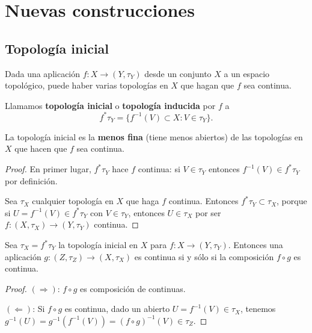 ﻿\section{Nuevas construcciones}


\subsection{Topología inicial}

Dada una aplicación $f: X \to (Y, \tau_Y)$ desde un conjunto $X$ a un espacio topológico, puede haber varias topologías en $X$ que hagan que $f$ sea continua.

\begin{definición}
    Llamamos \textbf{topología inicial} o \textbf{topología inducida} por $f$ a
    $$f^*\tau_Y = \{f^{-1}(V) \subset X : V \in \tau_Y\}.$$
\end{definición}


\begin{proposición}
    La topología inicial es la \textbf{menos fina} (tiene menos abiertos) de las topologías en $X$ que hacen que $f$ sea continua.
\end{proposición}
\begin{proof}
    En primer lugar, $f^*\tau_Y$ hace $f$ continua: si $V \in \tau_Y$ entonces $f^{-1}(V) \in f^*\tau_Y$ por definición.

    Sea $\tau_X$ cualquier topología en $X$ que haga $f$ continua. Entonces $f^*\tau_Y \subset \tau_X$, porque si $U = f^{-1}(V) \in f^*\tau_Y$ con $V \in \tau_Y$, entonces $U \in \tau_X$ por ser $f: (X, \tau_X) \to (Y, \tau_Y)$ continua.
\end{proof}

\begin{proposición}
    Sea $\tau_X = f^*\tau_Y$ la topología inicial en $X$ para $f: X \to (Y, \tau_Y)$. Entonces una aplicación $g: (Z, \tau_Z) \to (X, \tau_X)$ es continua si y sólo si la composición $f \circ g$ es continua.
\end{proposición}
\begin{proof}
    $(\Rightarrow)$: $f \circ g$ es composición de continuas.

    $(\Leftarrow)$: Si $f \circ g$ es continua, dado un abierto $U = f^{-1}(V) \in \tau_X$, tenemos $g^{-1}(U) = g^{-1}(f^{-1}(V)) = (f \circ g)^{-1}(V) \in \tau_Z$.
\end{proof}

